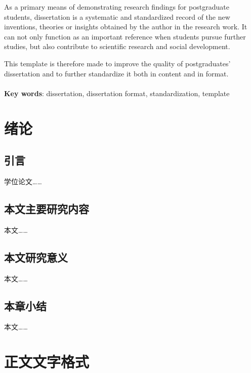 \documentclass[UTF8,a4paper,12pt]{ctexart}
\numberwithin{equation}{section}
\begin{document}
\hspace{8mm}As a primary means of demonstrating research findings for postgraduate students, dissertation is a systematic and standardized record of the new inventions, theories or insights obtained by the author in the research work. It can not only function as an important reference when students pursue further studies, but also contribute to scientific research and social development.\par 
This template is therefore made to improve the quality of postgraduates’ dissertation and to further standardize it both in content and in format.\\
~\\ 
\textbf{Key words}: dissertation, dissertation format, standardization, template

\newpage
\renewcommand\contentsname{\textbf{目\quad录}}
\begin{center}
{\tableofcontents
\thispagestyle{fancy}
}
\end{center}

\newpage
{}
\section{绪论}
\subsection{引言}
学位论文……
\subsection{本文主要研究内容}
本文……
\subsection{本文研究意义}
本文……
\subsection{本章小结}
本文……

\newpage
{}
\section{正文文字格式}
\end{document}
